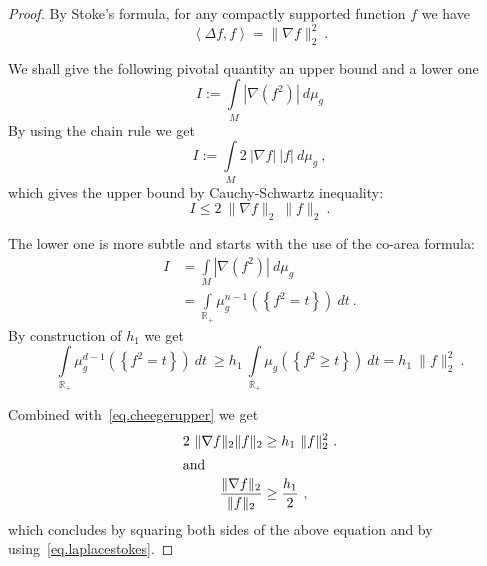 \documentclass[AHL,Unicode,longabstracts,published]{cedram}
\newcommand{\RR}{\mathbb{R}}
\newcommand{\inte}[1]{\underset{#1}{\int}}
\begin{document}
\begin{proof}
By Stoke's formula, for any compactly supported function $f$ we have
\begin{equation}\label{eq.laplacestokes}
\left<\Delta f, f\right> = \| \nabla f\|^2_{2} \ .
\end{equation}

We shall give the following pivotal quantity an upper bound and a lower one
\[
I := \inte{M} |\nabla (f^2) | \ d \mu_g
\]
By using the chain rule we get
\[
I := \inte{M} 2 \ |\nabla f| \ |f| \ d\mu_g \ ,
\]
which gives the upper bound by Cauchy-Schwartz inequality:
\begin{equation}\label{eq.cheegerupper}
I \le 2 \ \| \nabla f\|_{2} \ \|f\|_{2} \ .
\end{equation}

The lower one is more subtle and starts with the use of the co-area formula:
\begin{align*}
I & = \inte{M} \left|\nabla \left(f^2\right) \right| \ d \mu_g \\
& = \inte{\RR_+} \mu^{n-1}_g\left(\left\{ f^2=t \right\}\right)\ dt \ .
\end{align*}
By construction of $h_1$ we get
\begin{equation*}
\inte{\RR_+} \mu^{d-1}_g\left(\left\{ f^2=t \right\}\right)\ dt \ \ge h_1 \ \inte{\RR_+} \mu_g\left(\left\{ f^2 \ge t \right\}\right) \ dt = h_1 \ \|f\|^2_{2} \ .
\end{equation*}

Combined with~\eqref{eq.cheegerupper} we get
\begin{align*}
2 \ \| \nabla f\|_{2} \|f\|_{2} &\ge h_1 \ \|f\|^2_{2} \ .
\\
\intertext{and}
\frac{\| \nabla f\|_{2}}{\|f\|_{2}} &\ge \frac{h_1}{2} \ ,
\end{align*}
which concludes by squaring both sides of the above equation and by using~\eqref{eq.laplacestokes}.
\end{proof}
\end{document}
